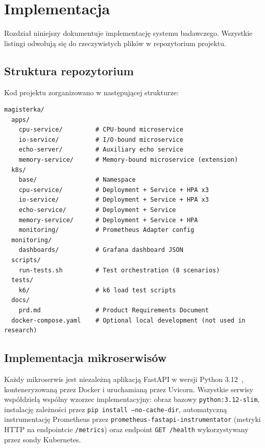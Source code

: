 \chapter{Implementacja}

Rozdział niniejszy dokumentuje implementację systemu badawczego. Wszystkie listingi odwołują się do rzeczywistych plików w repozytorium projektu.

\section{Struktura repozytorium}

Kod projektu zorganizowano w następującej strukturze:

\begin{verbatim}
magisterka/
  apps/
    cpu-service/         # CPU-bound microservice
    io-service/          # I/O-bound microservice
    echo-server/         # Auxiliary echo service
    memory-service/      # Memory-bound microservice (extension)
  k8s/
    base/                # Namespace
    cpu-service/         # Deployment + Service + HPA x3
    io-service/          # Deployment + Service + HPA x3
    echo-service/        # Deployment + Service
    memory-service/      # Deployment + Service + HPA
    monitoring/          # Prometheus Adapter config
  monitoring/
    dashboards/          # Grafana dashboard JSON
  scripts/
    run-tests.sh         # Test orchestration (8 scenarios)
  tests/
    k6/                  # k6 load test scripts
  docs/
    prd.md               # Product Requirements Document
  docker-compose.yaml    # Optional local development (not used in research)
\end{verbatim}

\section{Implementacja mikroserwisów}

Każdy mikroserwis jest niezależną aplikacją FastAPI w wersji Python 3.12~\cite{fastapi}, konteneryzowaną przez Docker i uruchamianą przez Uvicorn. Wszystkie serwisy współdzielą wspólny wzorzec implementacyjny: obraz bazowy \texttt{python:3.12-slim}, instalację zależności przez \texttt{pip install --no-cache-dir}, automatyczną instrumentację Prometheus przez \texttt{prometheus-fastapi-instrumentator} (metryki HTTP na endpointcie \texttt{/metrics}) oraz endpoint \texttt{GET /health} wykorzystywany przez sondy Kubernetes.

